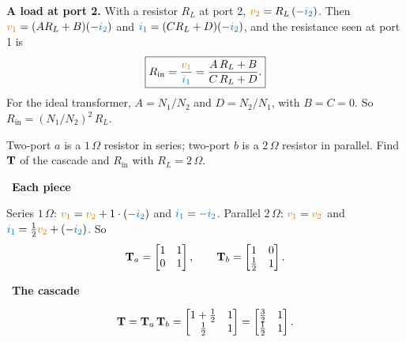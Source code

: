 \documentclass[11pt,a4paper]{article}
\newcommand{\Icol}[1]{\textcolor{ccur}{#1}}
\newcommand{\Vcol}[1]{\textcolor{cvolt}{#1}}
\newif\ifsolfirst
\newcommand{\solution}{\par\smallskip\noindent{\color{cpow}\bfseries Solution}\par\nobreak\smallskip\global\solfirsttrue}
\newcommand{\solstep}[2]{\par\ifsolfirst\global\solfirstfalse\else\bigskip\needspace{5\baselineskip}\fi
  \noindent{\color{cpow}\bfseries Step #1.}\ {\bfseries #2}\par\nobreak\smallskip}
\newcommand{\ohm}{\,\Omega}
\newcommand{\vone}{\Vcol{v_1}}  \newcommand{\vtwo}{\Vcol{v_2}}
\newcommand{\ione}{\Icol{i_1}}  \newcommand{\itwo}{\Icol{i_2}}
\newcommand{\pone}[2]{%
  \draw (#1,#2) node[ocirc] {}; \draw (#1,0) node[ocirc] {};
  \draw[iar] (#1+0.2,#2+0.28) -- (#1+0.75,#2+0.28); \node[font=\small, text=ccur] at (#1+0.48,#2+0.58) {$i_1$};
  \node[pol] at (#1+0.3,0.72*#2) {$+$}; \node[pol] at (#1+0.3,0.22*#2) {$-$};
  \node[font=\small, text=cvolt] at (#1+0.32,0.47*#2) {$v_1$};}
\begin{document}
\textbf{A load at port 2.} With a resistor $R_L$ at port 2, $\vtwo = R_L\,(-\itwo)$. Then
$\vone = (A R_L + B)(-\itwo)$ and $\ione = (C R_L + D)(-\itwo)$, and the resistance seen at
port 1 is
\[
  \boxed{R_{\mathrm{in}} = \frac{\vone}{\ione} = \frac{A\,R_L + B}{C\,R_L + D} .}
\]
For the ideal transformer, $A = N_1/N_2$ and $D = N_2/N_1$, with $B = C = 0$. So
$R_{\mathrm{in}} = (N_1/N_2)^2\,R_L$.

\bigskip
\begin{examplebox}
\begin{minipage}[c]{0.5\linewidth}
\centering
{}
\end{minipage}\hfill
\begin{minipage}[c]{0.46\linewidth}
Two-port $a$ is a $1\ohm$ resistor in series; two-port $b$ is a $2\ohm$ resistor in
parallel. Find $\mathbf{T}$ of the cascade and $R_{\mathrm{in}}$ with $R_L = 2\ohm$.
\end{minipage}
\end{examplebox}

\solution

\solstep{1}{Each piece}
Series $1\ohm$: $\vone = \vtwo + 1\cdot(-\itwo)$ and $\ione = -\itwo$. Parallel $2\ohm$:
$\vone = \vtwo$ and $\ione = \tfrac12\vtwo + (-\itwo)$. So
\[
  \mathbf{T}_a = \begin{bmatrix} 1 & 1\\ 0 & 1 \end{bmatrix}, \qquad
  \mathbf{T}_b = \begin{bmatrix} 1 & 0\\ \frac12 & 1 \end{bmatrix} .
\]

\solstep{2}{The cascade}
\[
  \mathbf{T} = \mathbf{T}_a\,\mathbf{T}_b
      = \begin{bmatrix} 1 + \frac12 & 1\\ \frac12 & 1 \end{bmatrix}
      = \begin{bmatrix} \frac32 & 1\\ \frac12 & 1 \end{bmatrix} .
\]
\end{document}
